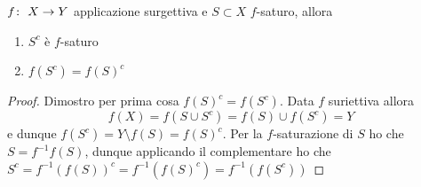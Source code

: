 \begin{lemma}
	$f \colon\ X \rightarrow Y$ applicazione surgettiva e $S \subset X$ $f$-saturo, allora 
	\begin{enumerate}
		\item $S^c$ è $f$-saturo 
		\item $f(S^c) = f(S)^c$
	\end{enumerate}
\end{lemma}
\begin{proof}
	Dimostro per prima cosa $f(S)^c = f(S^c)$. Data $f$ suriettiva allora 
	\begin{equation*}
		f(X) = f(S \cup S^c) = f(S) \cup f(S^c) = Y
	\end{equation*}
	e dunque $f(S^c) = Y \setminus f(S) = f(S)^c$. 
	Per la $f$-saturazione di $S$ ho che $S = f^{-1}f(S)$, dunque applicando il complementare ho che $S^c = f^{-1}(f(S))^c = f^{-1}(f(S)^c) = f^{-1}(f(S^c))$
\end{proof}

